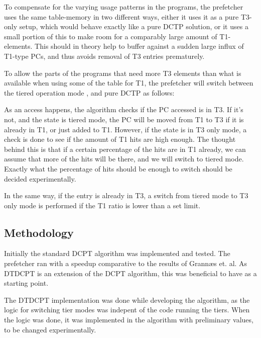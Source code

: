 To compensate for the varying usage patterns in the programs, the prefetcher
uses the same table-memory in two different ways, either it uses it as a pure
T3-only setup, which would behave exactly like a pure DCTP solution, or it
uses a small portion of this to make room for a comparably large amount of
T1-elements. This should in theory help to buffer against a sudden large
influx of T1-type PCs, and thus avoids removal of T3 entries
prematurely.

To allow the parts of the programs that need more T3 elements than what is
available when using some of the table for T1, the prefetcher will switch
between the tiered operation mode , and pure DCTP as follows:

As an access happens, the algorithm checks if the PC accessed is in T3. If it's
not, and the state is tiered mode, the PC will be moved from T1 to T3 if it is
already in T1, or just added to T1. However, if the state is in T3 only
mode, a check is done to see if the amount of T1 hits are high enough. The
thought behind this is that if a certain percentage of the hits are in T1
already, we can assume that more of the hits will be there, and we will switch
to tiered mode. Exactly what the percentage of hits should be enough to
switch should be decided experimentally.

In the same way, if the entry is already in T3, a switch from tiered mode to
T3 only mode is performed if the T1 ratio is lower than a set limit.

\subsection{Methodology}

Initially the standard DCPT algorithm was implemented and tested. The prefetcher ran 
with a speedup comparative to the results of Grannæs et. al. As  DTDCPT
is an extension of the DCPT algorithm, this was beneficial to have as a
starting point.

The DTDCPT implementation was done while developing the algorithm, as the logic
for switching tier modes was indepent of the code running the tiers. When the
logic was done, it was implemented in the algorithm with preliminary values,
to be changed experimentally.


